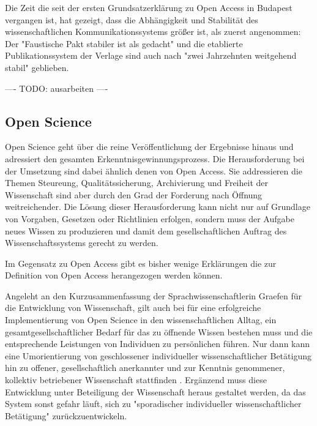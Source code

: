 Die Zeit die seit der ersten Grundsatzerklärung zu Open Access in Budapest vergangen ist, hat gezeigt, dass die Abhängigkeit und Stabilität des wissenschaftlichen Kommunikationssystems größer ist, als zuerst angenommen: Der "Faustische Pakt stabiler ist als gedacht" \cite{hagner_2015_sache_buches} und die etablierte Publikationssystem der Verlage sind auch nach "zwei Jahrzehnten weitgehend stabil" \cite{Hanekop_2014} geblieben.

---- TODO: ausarbeiten ----

\subsection{Open Science}

Open Science geht über die reine Veröffentlichung der Ergebnisse hinaus und adressiert den gesamten Erkenntnisgewinnungsprozess. Die Herausforderung bei der Umsetzung sind dabei ähnlich denen von Open Access. Sie addressieren die Themen Steureung, Qualitätssicherung, Archivierung und Freiheit der Wissenschaft sind aber durch den Grad der Forderung nach Öffnung weitreichender. Die Lösung dieser Herausforderung kann nicht nur auf Grundlage von Vorgaben, Gesetzen oder Richtlinien erfolgen, sondern muss der Aufgabe neues Wissen zu produzieren und damit dem gesellschaftlichen Auftrag des Wissenschaftssystems gerecht zu werden.

Im Gegensatz zu Open Access gibt es bisher wenige Erklärungen die zur Definition von Open Access herangezogen werden können.

Angeleht an den Kurzusammenfassung der Sprachwissenschaftlerin Graefen für die Entwicklung von Wissenschaft, gilt auch bei für eine erfolgreiche Implementierung von Open Science in den wissenschaftlichen Alltag, ein gesamtgesellschaftlicher Bedarf für das zu öffnende Wissen bestehen muss und die entsprechende Leistungen von Individuen zu persönlichen führen. Nur dann kann eine Umorientierung von geschlossener individueller wissenschaftlicher Betätigung hin zu offener, gesellschaftlich anerkannter und zur Kenntnis genommener, kollektiv betriebener Wissenschaft stattfinden \cite{graefen2007_wissenschaftliche_artikel}. Ergänzend muss diese Entwicklung unter Beteiligung der Wissenschaft heraus gestaltet werden, da das System sonst gefahr läuft, sich zu "sporadischer individueller wissenschaftlicher Betätigung"\cite{graefen2007_wissenschaftliche_artikel} zurückzuentwickeln.

